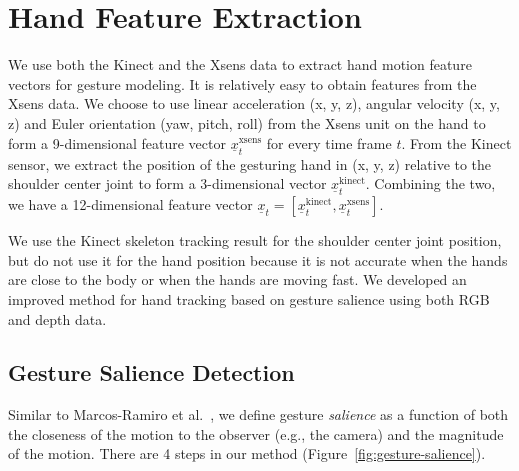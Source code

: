 \documentclass{sig-alternate-2013}
\begin{document}
\section{Hand Feature Extraction}
We use both the Kinect and the Xsens data to extract hand motion feature vectors for gesture modeling. 
It is relatively easy to obtain features from the Xsens data. We choose to use linear
acceleration (x, y, z), angular velocity (x, y, z) and Euler orientation (yaw, pitch, roll)
from the Xsens unit on the hand to form a 9-dimensional feature vector $\underline{x}_t^{\text{xsens}}$
for every time frame $t$.
From the Kinect sensor, we extract the position of the gesturing hand in (x, y, z) relative to
the shoulder center joint to
form a 3-dimensional vector $\underline{x}_t^{\text{kinect}}$. Combining the two, we
have a 12-dimensional feature vector $\underline{x}_t = [\underline{x}^\text{kinect}_t, \underline{x}^\text{xsens}_t]$.

We use the Kinect skeleton tracking result for the shoulder center joint position,
but do not use it for the hand position because
it is not accurate when the hands are close to the body or when the hands are moving fast.
We developed an improved method for hand tracking based on gesture salience using both
RGB and depth data.

\subsection{Gesture Salience Detection}
Similar to Marcos-Ramiro et al.~\cite{marcos2013}, we define gesture
\textit{salience} as a function of both the closeness of the motion to the
observer (e.g., the camera) and the magnitude of the motion.
There are 4 steps in our method (Figure~\ref{fig:gesture-salience}). 
\end{document}
